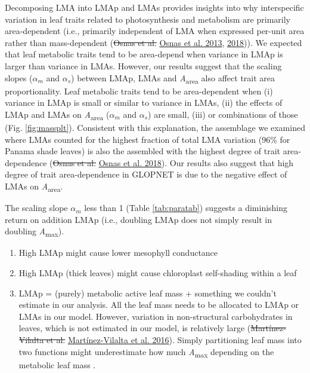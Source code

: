 \documentclass[
  12pt,
]{article}
\providecommand{\tightlist}{%
  \setlength{\itemsep}{0pt}\setlength{\parskip}{0pt}}
\providecommand{\DIFaddtex}[1]{{\protect\color{blue}\uwave{#1}}} %
\providecommand{\DIFdeltex}[1]{{\protect\color{red}\sout{#1}}}                      %
\providecommand{\DIFaddbegin}{} %
\providecommand{\DIFaddend}{} %
\providecommand{\DIFdelbegin}{} %
\providecommand{\DIFdelend}{} %
\providecommand{\DIFadd}[1]{\texorpdfstring{\DIFaddtex{#1}}{#1}} %
\providecommand{\DIFdel}[1]{\texorpdfstring{\DIFdeltex{#1}}{}} %
\newcommand{\DIFscaledelfig}{0.5}
\newlength{\DIFdelgraphicswidth} %
\newlength{\DIFdelgraphicsheight} %
\newcommand{\DIFaddincludegraphics}[2][]{{\color{blue}\fbox{\DIFOincludegraphics[#1]{#2}}}} %
\newcommand{\DIFdelincludegraphics}[2][]{%
\sbox{\DIFdelgraphicsbox}{\DIFOincludegraphics[#1]{#2}}%
\settoboxwidth{\DIFdelgraphicswidth}{\DIFdelgraphicsbox} %
\settoboxtotalheight{\DIFdelgraphicsheight}{\DIFdelgraphicsbox} %
\scalebox{\DIFscaledelfig}{%
\parbox[b]{\DIFdelgraphicswidth}{\usebox{\DIFdelgraphicsbox}\\[-\baselineskip] \rule{\DIFdelgraphicswidth}{0em}}\llap{\resizebox{\DIFdelgraphicswidth}{\DIFdelgraphicsheight}{%
\setlength{\unitlength}{\DIFdelgraphicswidth}%
\begin{picture}(1,1)%
\thicklines\linethickness{2pt} %
{\color[rgb]{1,0,0}\put(0,0){\framebox(1,1){}}}%
{\color[rgb]{1,0,0}\put(0,0){\line( 1,1){1}}}%
{\color[rgb]{1,0,0}\put(0,1){\line(1,-1){1}}}%
\end{picture}%
}\hspace*{3pt}}} %
} %
\DeclareRobustCommand{\DIFaddbegin}{\DIFOaddbegin \let\includegraphics\DIFaddincludegraphics} %
\DeclareRobustCommand{\DIFaddend}{\DIFOaddend \let\includegraphics\DIFOincludegraphics} %
\DeclareRobustCommand{\DIFdelbegin}{\DIFOdelbegin \let\includegraphics\DIFdelincludegraphics} %
\DeclareRobustCommand{\DIFdelend}{\DIFOaddend \let\includegraphics\DIFOincludegraphics} %
\begin{document}
Decomposing LMA into LMAp and LMAs provides insights into why interspecific variation in leaf traits related to photosynthesis and metabolism are primarily area-dependent (i.e., primarily independent of LMA when expressed per-unit area rather than mass-dependent (\DIFdelbegin \DIFdel{Osnas et al. }\DIFdelend \protect\DIFdelbegin %
\DIFdelend \DIFaddbegin \hyperlink{ref-Osnas2013}{Osnas et al. 2013}\DIFaddend , \protect\hyperlink{ref-Osnas2018}{2018})).
We expected that leaf metabolic traits tend to be area-depend when variance in LMAp is larger than variance in LMAs.
However, our results suggest that the scaling slopes (\DIFdelbegin \DIFdel{\(\alpha_m\) }\DIFdelend \DIFaddbegin \DIFadd{\(\alpha_p\) }\DIFaddend and \(\alpha_s\)) between LMAp, LMAs and \emph{A}\textsubscript{area} also affect trait area proportionality.
Leaf metabolic traits tend to be area-dependent when (i) variance in LMAp is small or similar to variance in LMAs, (ii) the effects of LMAp and LMAs on \emph{A}\textsubscript{area} (\DIFdelbegin \DIFdel{\(\alpha_m\) }\DIFdelend \DIFaddbegin \DIFadd{\(\alpha_p\) }\DIFaddend and \(\alpha_s\)) are small, (iii) or combinations of those (Fig. \DIFaddbegin \DIFadd{Fig.~}\DIFaddend \ref{fig:massplt}).
Consistent with this explanation, the assemblage we examined where LMAs counted for the highest fraction of total LMA variation (96\% for Panama shade leaves) is also the assembled with the highest degree of trait area-dependence (\DIFdelbegin \DIFdel{Osnas et al. }\DIFdelend \protect\DIFdelbegin %
\DIFdelend \DIFaddbegin \hyperlink{ref-Osnas2018}{Osnas et al. 2018}\DIFaddend ).
Our results also suggest that high degree of trait area-dependence in GLOPNET is due to the negative effect of LMAs on \emph{A}\textsubscript{area}.

The scaling slope \DIFdelbegin \DIFdel{\(\alpha_m\) }\DIFdelend \DIFaddbegin \DIFadd{\(\alpha_p\) }\DIFaddend less than 1 (Table \ref{tab:paratab}) suggests a diminishing return on addition LMAp (i.e., doubling LMAp does not simply result in doubling \emph{A}\textsubscript{max}).

\begin{enumerate}
\def\labelenumi{\arabic{enumi}.}
\tightlist
\item
  High LMAp might cause lower mesophyll conductance
\item
  High LMAp (thick leaves) might cause chloroplast self-shading within a leaf
\item
  LMAp = (purely) metabolic active leaf mass + something we couldn't estimate in our analysis. All the leaf mass needs to be allocated to LMAp or LMAs in our model. However, variation in non-structural carbohydrates in leaves, which is not estimated in our model, is relatively large (\DIFdelbegin \DIFdel{Martínez-Vilalta et al. }\DIFdelend \protect\DIFdelbegin %
\DIFdelend \DIFaddbegin \hyperlink{ref-Martinez-Vilalta2016}{Martínez-Vilalta et al. 2016}\DIFaddend ). Simply partitioning leaf mass into two functions might underestimate how much \emph{A}\textsubscript{max} depending on the metabolic leaf mass .
\end{enumerate}
\end{document}
